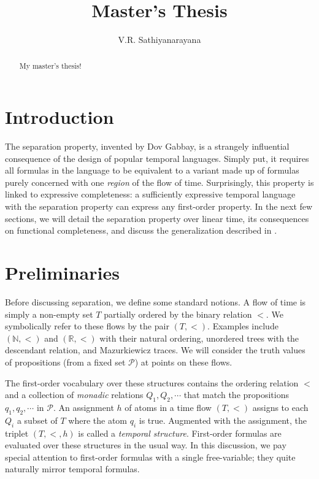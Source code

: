 \documentclass[a4paper,UKenglish,cleveref, autoref, thm-restate, numberwithinsect]{lipics-v2021}
\title{Master's Thesis} %
\author{V.R. Sathiyanarayana}{Chennai Mathematical Institute, India \and \url{http://sathiyavrs.netlify.app}}{sathiyanarayana@cmi.ac.in}{}{}%
\begin{document}
\maketitle

\begin{abstract}
My master's thesis!
\end{abstract}

\section{Introduction}
\label{sec:introduction}

The separation property, invented by Dov Gabbay, is a strangely influential consequence of the design of popular temporal languages. Simply put, it requires all formulas in the language to be equivalent to a variant made up of formulas purely concerned with one \textit{region} of the flow of time. Surprisingly, this property is linked to expressive completeness: a sufficiently expressive temporal language with the separation property can express any first-order property. In the next few sections, we will detail the separation property over linear time, its consequences on functional completeness, and discuss the generalization described in \cite{gabbay1994}.

\section{Preliminaries}

Before discussing separation, we define some standard notions. A flow of time is simply a non-empty set $T$ partially ordered by the binary relation $<$. We symbolically refer to these flows by the pair $(T, <)$. Examples include $(\mathbb{N}, <)$ and $(\mathbb{R}, <)$ with their natural ordering, unordered trees with the descendant relation, and Mazurkiewicz traces. We will consider the truth values of propositions (from a fixed set $\mathcal{P}$) at points on these flows.

The first-order vocabulary over these structures contains the ordering relation $<$ and a collection of \textit{monadic} relations $Q_1, Q_2, \cdots$ that match the propositions $q_1, q_2, \cdots$ in $\mathcal{P}$. An assignment $h$ of atoms in a time flow $(T, <)$ assigns to each $Q_i$ a subset of $T$ where the atom $q_i$ is true. Augmented with the assignment, the triplet $(T, <, h)$ is called a \textit{temporal structure}. First-order formulas are evaluated over these structures in the usual way. In this discussion, we pay special attention to first-order formulas with a single free-variable; they quite naturally mirror temporal formulas.
\end{document}
